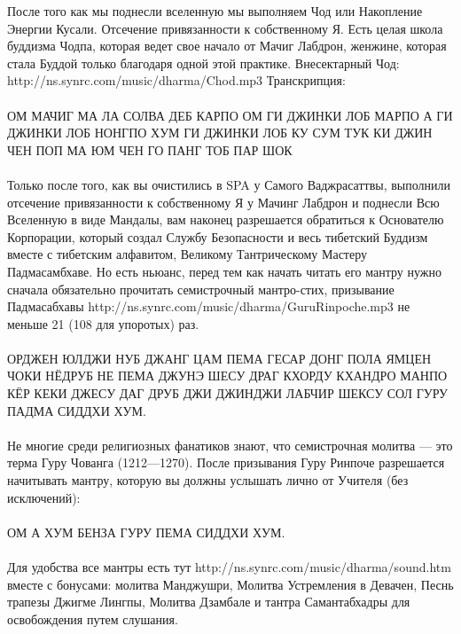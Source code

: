 После того как мы поднесли вселенную мы выполняем
Чод или Накопление Энергии Кусали. Отсечение
привязанности к собственному Я. Есть целая школа
буддизма Чодпа, которая ведет свое начало от Мачиг Лабдрон,
женжине, которая стала Буддой только благодаря одной
этой практике. Внесектарный Чод: http://ns.synrc.com/music/dharma/Chod.mp3
Транскрипция:
\\
\\
ОМ МАЧИГ МА ЛА СОЛВА ДЕБ КАРПО ОМ ГИ ДЖИНКИ ЛОБ
МАРПО А ГИ ДЖИНКИ ЛОБ НОНГПО ХУМ ГИ ДЖИНКИ ЛОБ
КУ СУМ ТУК КИ ДЖИН ЧЕН ПОП МА ЮМ ЧЕН ГО ПАНГ ТОБ ПАР ШОК
\\
\\
Только после того, как вы очистились в SPA у Самого Ваджрасаттвы,
выполнили отсечение привязанности к собственному Я у Мачинг Лабдрон
и поднесли Всю Вселенную в виде Мандалы, вам наконец разрешается
обратиться к Основателю Корпорации, который создал Службу
Безопасности и весь тибетский Буддизм вместе с тибетским
алфавитом, Великому Тантрическому Мастеру Падмасамбхаве.
Но есть ньюанс, перед тем как начать читать его мантру
нужно сначала обязательно прочитать семистрочный мантро-стих,
призывание Падмасабхавы http://ns.synrc.com/music/dharma/GuruRinpoche.mp3
не меньше 21 (108 для упоротых) раз.
\\
\\
ОРДЖЕН ЮЛДЖИ НУБ ДЖАНГ ЦАМ ПЕМА ГЕСАР ДОНГ ПОЛА
ЯМЦЕН ЧОКИ НЁДРУБ НЕ ПЕМА ДЖУНЭ ШЕСУ ДРАГ КХОРДУ
КХАНДРО МАНПО КЁР КЕКИ ДЖЕСУ ДАГ ДРУБ ДЖИ ДЖИНДЖИ
ЛАБЧИР ШЕКСУ СОЛ ГУРУ ПАДМА СИДДХИ ХУМ.
\\
\\
Не многие среди религиозных фанатиков знают, что семистрочная
молитва — это терма Гуру Чованга (1212—1270). После призывания
Гуру Ринпоче разрешается начитывать мантру, которую вы должны
услышать лично от Учителя (без исключений):
\\
\\
ОМ А ХУМ БЕНЗА ГУРУ ПЕМА СИДДХИ ХУМ.
\\
\\
Для удобства все мантры есть тут http://ns.synrc.com/music/dharma/sound.htm
вместе с бонусами: молитва Манджушри, Молитва Устремления в Девачен, Песнь
трапезы Джигме Лингпы, Молитва Дзамбале и тантра Самантабхадры для
освобождения путем слушания.

